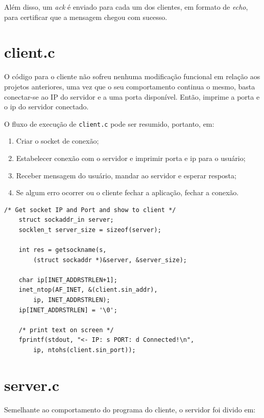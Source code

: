 \documentclass[10pt,twocolumn,letterpaper]{article}
\begin{document}
Além disso, um \textit{ack} é enviado para cada um dos clientes, em formato de \textit{echo}, para certificar que a mensagem chegou com sucesso.

\section{client.c}
O código para o cliente não sofreu nenhuma modificação funcional em relação aos projetos anteriores,
uma vez que o seu comportamento continua o mesmo, basta conectar-se ao IP do servidor e 
a uma porta disponível. Então, imprime a porta e o ip do servidor conectado.

O fluxo de execução de \texttt{client.c} pode ser resumido, portanto, em:

\begin{enumerate}
    \item Criar o socket de conexão;
    \item Estabelecer conexão com o servidor e imprimir porta e ip para o usuário;
    \item Receber mensagem do usuário, mandar ao servidor e esperar resposta;
    \item Se algum erro ocorrer ou o cliente fechar a aplicação, fechar a conexão.
\end{enumerate}


\begin{lstlisting}[caption={Recuperação da porta e IP do servidor conectado}, label=Algorithm]
    /* Get socket IP and Port and show to client */
    struct sockaddr_in server;
    socklen_t server_size = sizeof(server);

    int res = getsockname(s, 
        (struct sockaddr *)&server, &server_size);

    char ip[INET_ADDRSTRLEN+1];
    inet_ntop(AF_INET, &(client.sin_addr), 
        ip, INET_ADDRSTRLEN);
    ip[INET_ADDRSTRLEN] = '\0';

    /* print text on screen */
    fprintf(stdout, "<- IP: s PORT: d Connected!\n", 
        ip, ntohs(client.sin_port));
\end{lstlisting}

\section{server.c}
Semelhante ao comportamento do programa do cliente, o servidor foi divido em:
\end{document}
